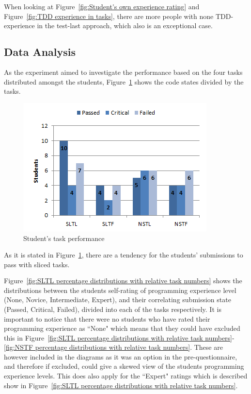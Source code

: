\documentclass{sig-alternate-05-2015}
\begin{document}
When looking at Figure~\ref{fig:Student's own experience rating} and Figure~\ref{fig:TDD experience in tasks}, there are more people with none TDD-experience in the test-last approach, which also is an exceptional case.

\subsection{Data Analysis}
\label{DataAnalysis}
As the experiment aimed to investigate the performance based on the four tasks distributed amongst the students, Figure~\ref{fig:Student's task performance} shows the code states divided by the tasks.

\begin{figure}[!ht]
	\centering
	\includegraphics[width=1\linewidth]{img05}
	\caption{Student's task performance}
	\label{fig:Student's task performance}
\end{figure}

As it is stated in Figure~\ref{fig:Student's task performance}, there are a tendency for the students' submissions to pass with sliced tasks.

Figure~\ref{fig:SLTL percentage distributions with relative task numbers} shows the distributions between the students self-rating of programming experience level (None, Novice, Intermediate, Expert), and their correlating submission state (Passed, Critical, Failed), divided into each of the tasks respectively.
It is important to notice that there were no students who have rated their programming experience  as ``None" which means that they could have excluded this in Figure~\ref{fig:SLTL percentage distributions with relative task numbers}-\ref{fig:NSTF percentage distributions with relative task numbers}. These are however included in the diagrams as it was an option in the pre-questionnaire, and therefore if excluded, could give a skewed view of the students programming experience levels. This does also apply for the ``Expert" ratings which is described show in Figure~\ref{fig:SLTL percentage distributions with relative task numbers}.
\end{document}
